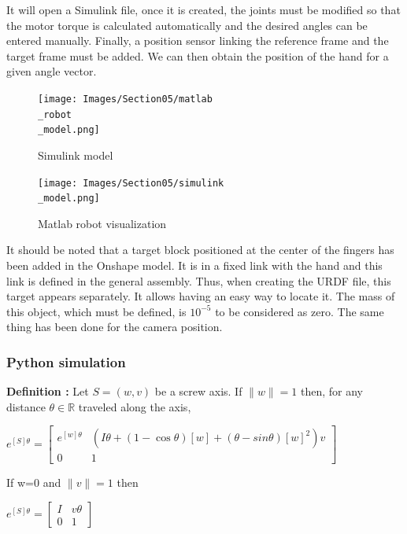 \bigbreak
It will open a Simulink file, once it is created, the joints must be modified so that the motor torque is calculated automatically and the desired angles can be entered manually. Finally, a position sensor linking the reference frame and the target frame must be added. We can then obtain the position of the hand for a given angle vector. 

\bigbreak
\begin{figure}[ht]
    \centering
    \texttt{[image: Images/Section05/matlab\\\_robot\\\_model.png]}
    \caption{Simulink model}
    \label{fig:Simulink}
\end{figure}
\FloatBarrier

\bigbreak
\begin{figure}[ht]
    \centering
    \texttt{[image: Images/Section05/simulink\\\_model.png]}
    \caption{Matlab robot visualization}
    \label{fig:MatlabRobot}
\end{figure}
\FloatBarrier

\bigbreak
It should be noted that a target block positioned at the center of the fingers has been added in the Onshape model. It is in a fixed link with the hand and this link is defined in the general assembly. Thus, when creating the URDF file, this target appears separately. It allows having an easy way to locate it. The mass of this object, which must be defined, is $10^{-5}$ to be considered as zero. The same thing has been done for the camera position. 

\subsubsection{Python simulation}

\textbf{Definition :} Let $S = (w,v)$ be a screw axis. If $\|w\|=1$ then, for any distance $\theta\in\mathbb{R}$ traveled along the axis,
\begin{center}
    $e^{[S]\theta}=
    \begin{bmatrix}
        e^{[w]\theta} & (I\theta+(1-\cos\theta)[w]+(\theta-sin\theta)[w]^2)v\\
        0 & 1
    \end{bmatrix}$
\end{center}
If w=0 and $\|v\|=1$ then 
\begin{center}
    $e^{[S]\theta}=\begin{bmatrix}
        I & v\theta\\
        0 & 1
    \end{bmatrix}$
\end{center}

